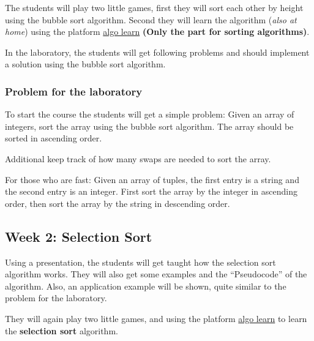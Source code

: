 \documentclass[10pt, oneside]{article}
\theoremstyle{remark}
\begin{document}
The students will play two little games, first they will sort each other by height using the bubble sort algorithm. Second they will learn the algorithm (\textit{also at home}) using the platform \href{https://tcs.uni-frankfurt.de/algo-learn-testing/refs_heads_feat-bubbleSort/en
}{algo learn} \textbf{(Only the part for sorting algorithms)}.

In the laboratory, the students will get following problems and should implement a solution using the bubble sort algorithm.

\subsubsection*{Problem for the laboratory}
\begin{tcolorbox}
  To start the course the students will get a simple problem: Given an array of integers, sort the array using the bubble sort algorithm. The array should be sorted in ascending order. 
  
  \vspace{1em}
  
  Additional keep track of how many swaps are needed to sort the array.
  
  \vspace{1em}
  
  For those who are fast: Given an array of tuples, the first entry is a string and the second entry is an integer. First sort the array by the integer in ascending order, then sort the array by the string in descending order.
\end{tcolorbox}

\subsection{Week 2: Selection Sort}
Using a presentation, the students will get taught how the selection sort algorithm works. They will also get some examples and the \enquote{Pseudocode} of the algorithm. Also, an application example will be shown, quite similar to the problem for the laboratory. 

They will again play two little games,  and using the platform \href{https://tcs.uni-frankfurt.de/algo-learn-testing/refs_heads_feat-bubbleSort/en
}{algo learn} to learn the \textbf{selection sort} algorithm. 
\end{document}
